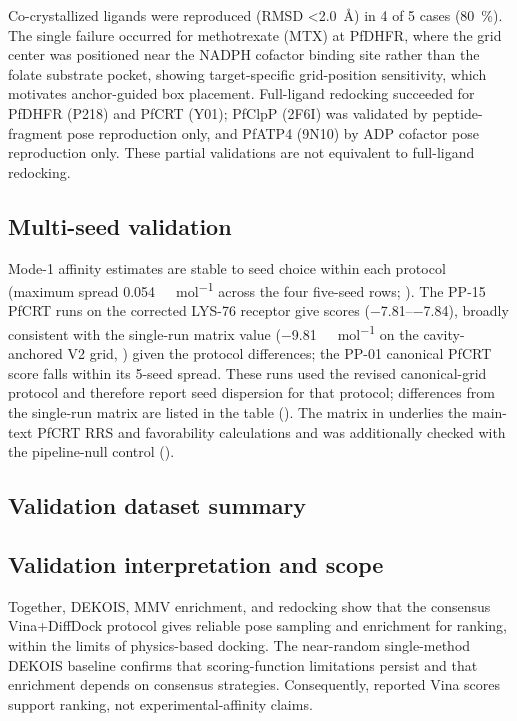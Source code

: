 \documentclass[journal=jcisd8,manuscript=suppinfo]{achemso}
\begin{document}
Co-crystallized ligands were reproduced (RMSD \qty{<2.0}{\angstrom}) in \num{4} of \num{5} cases (\qty{80}{\percent}). The single failure occurred for methotrexate (MTX) at PfDHFR, where the grid center was positioned near the NADPH cofactor binding site rather than the folate substrate pocket, showing target-specific grid-position sensitivity, which motivates anchor-guided box placement. Full-ligand redocking succeeded for PfDHFR (P218) and PfCRT (Y01); PfClpP (2F6I) was validated by peptide-fragment pose reproduction only, and PfATP4 (9N10) by ADP cofactor pose reproduction only. These partial validations are not equivalent to full-ligand redocking.

\subsection{Multi-seed validation}\label{sec:sm_val_multiseed}


Mode-1 affinity estimates are stable to seed choice within each protocol (maximum spread \num{0.054}~\si{\kilo\calorie\per\mole} across the four five-seed rows; ). The PP-15 PfCRT runs on the corrected LYS-76 receptor give scores (\numrange{-7.81}{-7.84}), broadly consistent with the single-run matrix value (\num{-9.81}~\si{\kilo\calorie\per\mole} on the cavity-anchored V2 grid, ) given the protocol differences; the PP-01 canonical PfCRT score falls within its \num{5}-seed spread. These runs used the revised canonical-grid protocol and therefore report seed dispersion for that protocol; differences from the single-run matrix are listed in the table (). The matrix in  underlies the main-text PfCRT RRS and favorability calculations and was additionally checked with the pipeline-null control ().

\subsection{Validation dataset summary}\label{sec:sm_val_datasets}


\subsection{Validation interpretation and scope}\label{sec:sm_val_scope}
Together, DEKOIS, MMV enrichment, and redocking show that the consensus Vina+DiffDock protocol gives reliable pose sampling and enrichment for ranking, within the limits of physics-based docking. The near-random single-method DEKOIS baseline confirms that scoring-function limitations persist and that enrichment depends on consensus strategies. Consequently, reported Vina scores support ranking, not experimental-affinity claims.
\end{document}

